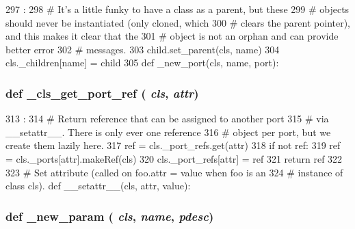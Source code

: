 \begin{DoxyCode}
297                                         :
298         # It's a little funky to have a class as a parent, but these
299         # objects should never be instantiated (only cloned, which
300         # clears the parent pointer), and this makes it clear that the
301         # object is not an orphan and can provide better error
302         # messages.
303         child.set_parent(cls, name)
304         cls._children[name] = child
305 
    def _new_port(cls, name, port):
\end{DoxyCode}
\hypertarget{classm5_1_1SimObject_1_1MetaSimObject_aed37f2662342d9fb731fb7b3454eda7f}{
\subsubsection[{\_\-cls\_\-get\_\-port\_\-ref}]{\setlength{\rightskip}{0pt plus 5cm}def \_\-cls\_\-get\_\-port\_\-ref ( {\em cls}, \/   {\em attr})}}
\label{classm5_1_1SimObject_1_1MetaSimObject_aed37f2662342d9fb731fb7b3454eda7f}



\begin{DoxyCode}
313                                     :
314         # Return reference that can be assigned to another port
315         # via __setattr__.  There is only ever one reference
316         # object per port, but we create them lazily here.
317         ref = cls._port_refs.get(attr)
318         if not ref:
319             ref = cls._ports[attr].makeRef(cls)
320             cls._port_refs[attr] = ref
321         return ref
322 
323     # Set attribute (called on foo.attr = value when foo is an
324     # instance of class cls).
    def __setattr__(cls, attr, value):
\end{DoxyCode}
\hypertarget{classm5_1_1SimObject_1_1MetaSimObject_ac8e49572c0c90b02af544331ef1fe28c}{
\subsubsection[{\_\-new\_\-param}]{\setlength{\rightskip}{0pt plus 5cm}def \_\-new\_\-param ( {\em cls}, \/   {\em name}, \/   {\em pdesc})}}
\label{classm5_1_1SimObject_1_1MetaSimObject_ac8e49572c0c90b02af544331ef1fe28c}



